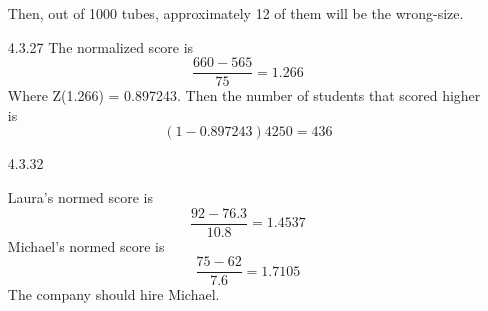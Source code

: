 \documentclass[11pt,fleqn]{article}
\begin{document}
\begin{enumerate}
  Then, out of 1000 tubes, approximately 12 of them will be the wrong-size. 
  \item[4.3.27]
 The normalized score is
  \[
  \frac{660-565}{75} = 1.266
  \]
  Where Z(1.266) = 0.897243. Then the number of students that scored higher is 
  \[
  (1-0.897243)4250 = 436
  \]
  \item[4.3.32]
  
  Laura's normed score is 
  \[
  \frac{92-76.3}{10.8} = 1.4537
  \]
  Michael's normed score is
  \[
  \frac{75-62}{7.6} = 1.7105
  \]
  The company should hire Michael. 
\end{enumerate}
\end{document}
